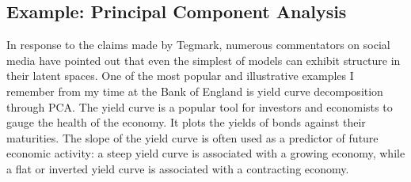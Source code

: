 \documentclass{article}
\theoremstyle{plain}
\theoremstyle{definition}
\theoremstyle{remark}
\begin{document}
\subsection{Example: Principal Component
Analysis}\label{example-principal-component-analysis}

In response to the claims made by Tegmark, numerous commentators on
social media have pointed out that even the simplest of models can
exhibit structure in their latent spaces. One of the most popular and
illustrative examples I remember from my time at the Bank of England is
yield curve decomposition through PCA. The yield curve is a popular tool
for investors and economists to gauge the health of the economy. It
plots the yields of bonds against their maturities. The slope of the
yield curve is often used as a predictor of future economic activity: a
steep yield curve is associated with a growing economy, while a flat or
inverted yield curve is associated with a contracting economy.


\end{document}
